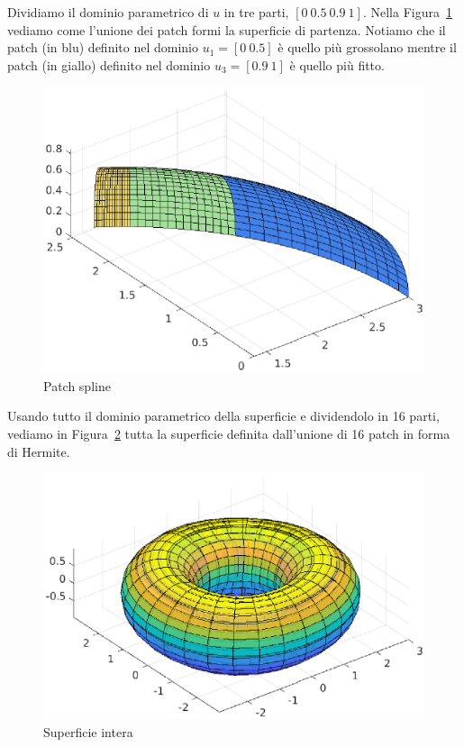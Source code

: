 \documentclass[12pt]{article}
\begin{document}
Dividiamo il dominio parametrico di $u$ in tre parti, $[0 \ 0.5 \ 0.9 \ 1]$. 
Nella Figura~\ref{fig:6} vediamo come l'unione dei patch formi la superficie di partenza.
Notiamo che il patch (in blu) definito nel dominio $u_1 = [0 \ 0.5]$ è quello più grossolano
mentre il patch (in giallo) definito nel dominio $u_3 = [0.9 \ 1]$ è quello più fitto.

\begin{figure}[H]
    \centering

    \includegraphics[scale=0.7]{img/splinePatch.eps}

    \caption{Patch spline}\label{fig:6}
\end{figure}

Usando tutto il dominio parametrico della superficie e dividendolo in 16 parti, vediamo in
Figura~\ref{fig:7} tutta la superficie definita dall'unione di 16 patch in forma di Hermite.
\begin{figure}[H]
    \centering

    \includegraphics[scale=0.7]{img/splineFullPatch.eps}

    \caption{Superficie intera }\label{fig:7}
\end{figure}
\end{document}
